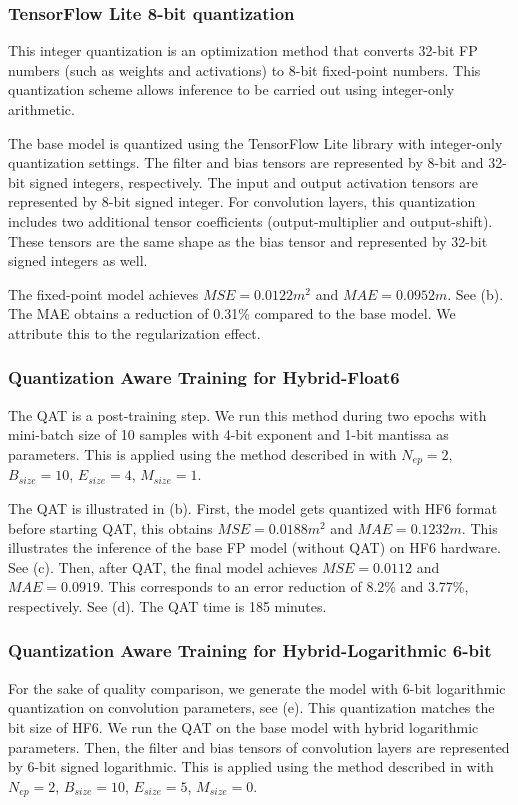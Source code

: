 \subsubsection{TensorFlow Lite 8-bit quantization}
This integer quantization is an optimization method that converts 32-bit FP numbers (such as weights and activations) to 8-bit fixed-point numbers. This quantization scheme allows inference to be carried out using integer-only arithmetic\cite{hannwindowsine}.

The base model is quantized using the TensorFlow Lite library with integer-only quantization settings. The filter and bias tensors are represented by 8-bit and 32-bit signed integers, respectively. The input and output activation tensors are represented by 8-bit signed integer. For convolution layers, this quantization includes two additional tensor coefficients (output-multiplier and output-shift). These tensors are the same shape as the bias tensor and represented by 32-bit signed integers as well.

The fixed-point model achieves $MSE=0.0122 m^2$ and $MAE=0.0952m$. See (b). The MAE obtains a reduction of 0.31\% compared to the base model. We attribute this to the regularization effect.

\subsubsection{Quantization Aware Training for Hybrid-Float6}
The QAT is a post-training step. We run this method during two epochs with mini-batch size of 10 samples with 4-bit exponent and 1-bit mantissa as parameters. This is applied using the method described in  with $N_{ep}=2$, $B_{size}=10$, $E_{size}=4$, $M_{size}=1$.

The QAT is illustrated in (b). First, the model gets quantized with HF6 format before starting QAT, this obtains $MSE=0.0188m^2$ and $MAE=0.1232m$. This illustrates the inference of the base FP model (without QAT) on HF6 hardware. See (c). Then, after QAT, the final model achieves $MSE=0.0112$ and $MAE=0.0919$. This corresponds to an error reduction of 8.2\% and 3.77\%, respectively. See (d). The QAT time is 185 minutes.

\subsubsection{Quantization Aware Training for Hybrid-Logarithmic 6-bit}
For the sake of quality comparison, we generate the model with 6-bit logarithmic quantization on convolution parameters, see (e). This quantization matches the bit size of HF6. We run the QAT on the base model with hybrid logarithmic parameters. Then, the filter and bias tensors of convolution layers are represented by 6-bit signed logarithmic. This is applied using the method described in  with $N_{ep}=2$, $B_{size}=10$, $E_{size}=5$, $M_{size}=0$.


